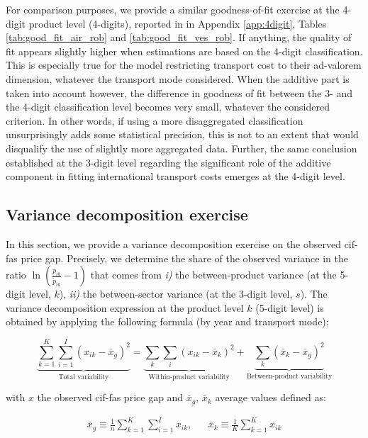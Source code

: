 \documentclass[a4paper,11pt]{article}
\begin{document}
For comparison purposes, we provide a similar goodness-of-fit exercise at the 4-digit product level (4-digits), reported in in Appendix \ref{app:4digit}, Tables \ref{tab:good_fit_air_rob} and \ref{tab:good_fit_ves_rob}.
If anything, the quality of fit appears slightly higher when estimations are based on the 4-digit classification.
This is especially true for the model restricting transport cost to their ad-valorem dimension, whatever the transport mode considered.
When the additive part is taken into account however, the difference in goodness of fit between the 3- and the 4-digit classification level becomes very small, whatever the considered criterion.
In other words, if using a more disaggregated classification unsurprisingly adds some statistical precision, this is not to an extent that would disqualify the use of slightly more aggregated data.
Further, the same conclusion established at the 3-digit level regarding the significant role of the additive component in fitting international transport costs emerges at the 4-digit level.



\subsection{Variance decomposition exercise \label{app:decomp_variance}}

In this section, we provide a variance decomposition exercise on the observed cif-fas price gap.
Precisely, we determine the share of the observed variance in the ratio $\ln(\frac{p_{ik}}{\widetilde{p}_{ik}}-1)$ that comes from \textit{i)} the between-product variance (at the 5-digit level, $k$), \textit{ii)} the between-sector variance (at the 3-digit level, $s$).
The variance decomposition expression at the product level $k$ (5-digit level) is obtained by applying the following formula (by year and transport mode):

$$\underbrace{\sum_{k=1}^K \sum_{i=1}^I \left(x_{ik} - \bar{x}_g  \right)^2}_{\text{Total variability}} = \underbrace{\sum_k \sum_i \left(x_{ik} - \bar{x}_k  \right)^2}_{\text{Within-product variability}} + \underbrace{\sum_k \left(\bar{x}_{k} - \bar{x}_g  \right)^2}_{\text{Between-product variability}}$$

with $x$ the observed cif-fas price gap and $\bar{x}_g$, $\bar{x}_k$ average values defined as:

\begin{eqnarray*}
\bar{x}_g \equiv \frac{1}{n} \sum_{k=1}^K \sum_{i=1}^I x_{ik},&& \bar{x}_k \equiv \frac{1}{K}\sum_{k=1}^K x_{ik}
\end{eqnarray*}
\end{document}
